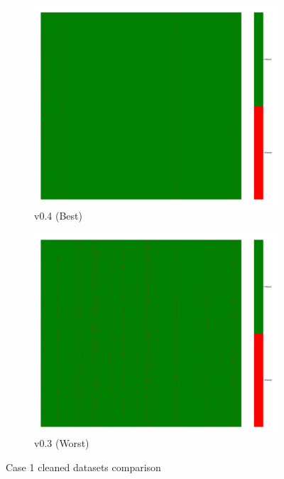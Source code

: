 \documentclass[a4paper,12pt]{article}
\begin{document}
\begin{figure}[H]
    \centering
    \begin{subfigure}{0.45\textwidth}
        \includegraphics[width=\linewidth]{case1_v0.4_heatmap_cleaned.png}
        \caption{v0.4 (Best)}
    \end{subfigure}
    \hfill
    \begin{subfigure}{0.45\textwidth}
        \includegraphics[width=\linewidth]{case1_v0.3_heatmap_cleaned.png}
        \caption{v0.3 (Worst)}
    \end{subfigure}
    \caption{Case 1 cleaned datasets comparison}
\end{figure}
\end{document}
